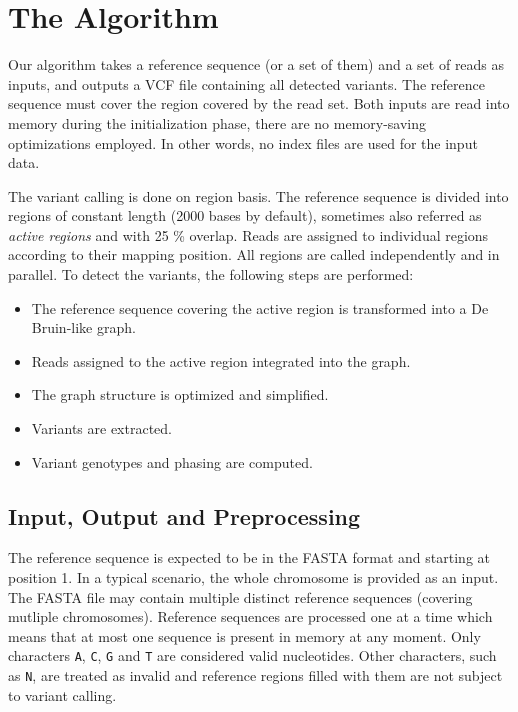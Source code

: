 \chapter{The Algorithm}
\label{chap:the-algorithm}

Our algorithm takes a reference sequence (or a set of them) and a set of reads as inputs, and outputs a VCF file containing all detected variants. The reference sequence must cover the region covered by the read set. Both inputs are read into memory during the initialization phase, there are no memory-saving optimizations employed. In other words, no index files are used for the input data.

The variant calling is done on region basis. The reference sequence is divided into regions of constant length (2000 bases by default), sometimes also referred as \textit{active regions} and with 25 \% overlap. Reads are assigned to individual regions according to their mapping position. All regions are called independently and in parallel. To detect the variants, the following steps are performed:
\begin{itemize}
\item The reference sequence covering the active region is transformed into a De Bruin-like graph.
\item Reads assigned to the active region integrated into the graph.
\item The graph structure is optimized and simplified.
\item Variants are extracted.
\item Variant genotypes and phasing are computed.
\end{itemize}

\section{Input, Output and Preprocessing}
\label{sec:input-output-and-preprocessing}

The reference sequence is expected to be in the FASTA format and starting at position 1. In a typical scenario, the whole chromosome is provided as an input. The FASTA file may contain multiple distinct reference sequences (covering mutliple chromosomes). Reference sequences are processed one at a time which means that at most one sequence is present in memory at any moment. Only characters \texttt{A}, \texttt{C}, \texttt{G} and \texttt{T} are considered valid nucleotides. Other characters, such as \texttt{N}, are treated as invalid and reference regions filled with them are not subject to variant calling.

